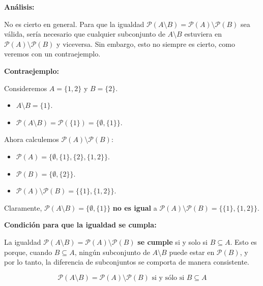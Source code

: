 \begin{solution}
\begin{itemize}
        \textbf{Análisis:}

        No es cierto en general. Para que la igualdad \( \mathscr{P}(A \setminus B) = \mathscr{P}(A) \setminus \mathscr{P}(B) \) sea válida, sería necesario que cualquier subconjunto de \( A \setminus B \) estuviera en \( \mathscr{P}(A) \setminus \mathscr{P}(B) \) y viceversa. Sin embargo, esto no siempre es cierto, como veremos con un contraejemplo.
        
        \textbf{Contraejemplo:}
        
        Consideremos \( A = \{1, 2\} \) y \( B = \{2\} \).
        
        \begin{itemize}
            \item \( A \setminus B = \{1\} \).
            \item \( \mathscr{P}(A \setminus B) = \mathscr{P}(\{1\}) = \{\emptyset, \{1\}\} \).
        \end{itemize}
        
        Ahora calculemos \( \mathscr{P}(A) \setminus \mathscr{P}(B) \):
        
        \begin{itemize}
            \item \( \mathscr{P}(A) = \{\emptyset, \{1\}, \{2\}, \{1, 2\}\} \).
            \item \( \mathscr{P}(B) = \{\emptyset, \{2\}\} \).
            \item \( \mathscr{P}(A) \setminus \mathscr{P}(B) = \{\{1\}, \{1, 2\}\} \).
        \end{itemize}
        
        Claramente, \( \mathscr{P}(A \setminus B) = \{\emptyset, \{1\}\} \) \textbf{no es igual} a \( \mathscr{P}(A) \setminus \mathscr{P}(B) = \{\{1\}, \{1, 2\}\} \).
        
        \textbf{Condición para que la igualdad se cumpla:}
        
        La igualdad \( \mathscr{P}(A \setminus B) = \mathscr{P}(A) \setminus \mathscr{P}(B) \) \textbf{se cumple} si y solo si \( B \subseteq A \). Esto es porque, cuando \( B \subseteq A \), ningún subconjunto de \( A \setminus B \) puede estar en \( \mathscr{P}(B) \), y por lo tanto, la diferencia de subconjuntos se comporta de manera consistente.
        
        \[
        \boxed{\mathscr{P}(A \setminus B) = \mathscr{P}(A) \setminus \mathscr{P}(B) \text{ si y sólo si } B \subseteq A}
        \]
    \end{itemize}
\end{solution}